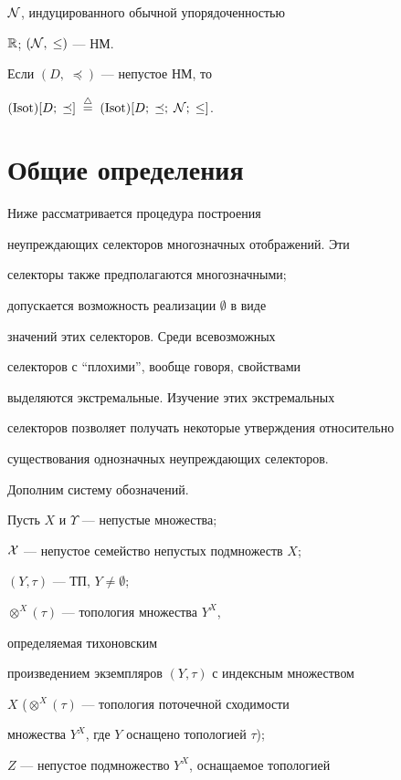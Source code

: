 ${\cal N}$, индуцированного обычной упорядоченностью


${\Bbb R}$; $({\cal N},\;\le)$ --- НМ.


Если $(D,\;\preceq)$ --- непустое НМ, то


$(\Isot)[D;\;\preceq]\;\stac \;(\Isot)[D;\;\preceq;\;


{\cal N};\;\le]$.





\section{Общие определения}





Ниже рассматривается процедура построения


неупреждающих селекторов многозначных отображений. Эти


селекторы также предполагаются многозначными;


допускается возможность реализации $\emptyset$ в виде


значений этих селекторов. Среди всевозможных


селекторов с ``плохими'', вообще говоря, свойствами


выделяются экстремальные. Изучение этих экстремальных


селекторов позволяет получать некоторые утверждения относительно


существования однозначных неупреждающих селекторов.





Дополним систему обозначений.


Пусть $X$ и $\Upsilon$ --- непустые множества;


${\cal X}$ --- непустое семейство непустых подмножеств $X$;


$(Y,\tau)$ --- ТП, $Y \ne \emptyset$;


${{\otimes}^X}(\tau)$ --- топология множества $Y^X$,


определяемая тихоновским


произведением экземпляров $(Y,\tau)$ с индексным множеством


$X$ (${{\otimes}^X}(\tau)$ --- топология поточечной сходимости


множества $Y^X$, где $Y$ оснащено топологией $\tau$);


$Z$ --- непустое подмножество $Y^X$, оснащаемое топологией


